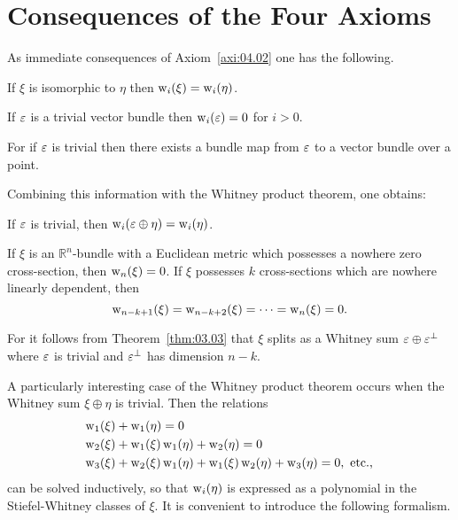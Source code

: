 \documentclass[../main]{subfiles}
\begin{document}
\section{Consequences of the Four Axioms}\label{sec:4.1}

As immediate consequences of Axiom~\ref{axi:04.02} one has the following.
\begin{proposition}\label{prop:04.01}
If $\xi$ is isomorphic to $\eta$ then $\operatorname{w}_i(\xi) = \operatorname{w}_i(\eta)$.
\end{proposition}

\begin{proposition}\label{prop:04.02}
If $\varepsilon$ is a trivial vector bundle then $\operatorname{w}_i(\varepsilon)=0$ for $i>0$.
\end{proposition}

For if $\varepsilon$ is trivial then there exists a bundle map from $\varepsilon$ to a vector bundle over a point.

Combining this information with the Whitney product theorem, one obtains:

\begin{proposition}\label{prop:04.03}
If $\varepsilon$ is trivial, then $\operatorname{w}_i(\varepsilon \oplus \eta)=\operatorname{w}_i(\eta)$.
\end{proposition}

\begin{proposition}\label{prop:04.04}
If $\xi$ is an $\mathbb{R}^{n}$-bundle with a Euclidean metric which possesses a nowhere zero cross-section, then $\operatorname{w}_{n}(\xi)=0$. If $\xi$ possesses $k$ cross-sections which are nowhere linearly dependent, then
\[
\operatorname{w}_{n-k+1}(\xi)=\operatorname{w}_{n-k+2}(\xi)=\dots=\operatorname{w}_{n}(\xi)=0 .
\]
\end{proposition}
For it follows from Theorem~\ref{thm:03.03} that $\xi$ splits as a Whitney sum $\varepsilon \oplus \varepsilon^{\perp}$ where $\varepsilon$ is trivial and $\varepsilon^{\perp}$ has dimension $n-k$.

A particularly interesting case of the Whitney product theorem occurs when the Whitney sum $\xi \oplus \eta$ is trivial. Then the relations
\[
\begin{aligned}
&\operatorname{w}_1(\xi)+\operatorname{w}_1(\eta)=0 \\
&\operatorname{w}_2(\xi)+\operatorname{w}_1(\xi) \operatorname{w}_1(\eta)+\operatorname{w}_2(\eta)=0 \\
&\operatorname{w}_3(\xi)+\operatorname{w}_2(\xi) \operatorname{w}_1(\eta)+\operatorname{w}_1(\xi) \operatorname{w}_2(\eta)+\operatorname{w}_3(\eta)=0, \text{ etc., }
\end{aligned}
\]
can be solved inductively, so that $\operatorname{w}_{i}(\eta)$ is expressed as a polynomial in the Stiefel-Whitney classes of $\xi$. It is convenient to introduce the following formalism.
\end{document}
